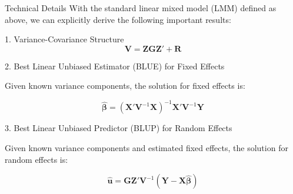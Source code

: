 \begin{frame}{Technical Details}
With the standard linear mixed model (LMM) defined as above, we can explicitly derive the following important results:

1. Variance-Covariance Structure
$$\mathbf{V} = \mathbf{Z}\mathbf{G}\mathbf{Z}' + \mathbf{R}$$

2. Best Linear Unbiased Estimator (BLUE) for Fixed Effects

Given known variance components, the solution for fixed effects is:

$$\hat{\boldsymbol{\beta}} = (\mathbf{X}'\mathbf{V}^{-1}\mathbf{X})^{-1}\mathbf{X}'\mathbf{V}^{-1}\mathbf{Y}$$

3. Best Linear Unbiased Predictor (BLUP) for Random Effects

Given known variance components and estimated fixed effects, the solution for random effects is:

$$\hat{\mathbf{u}} = \mathbf{G}\mathbf{Z}'\mathbf{V}^{-1}(\mathbf{Y} - \mathbf{X}\hat{\boldsymbol{\beta}})$$

\end{frame}


